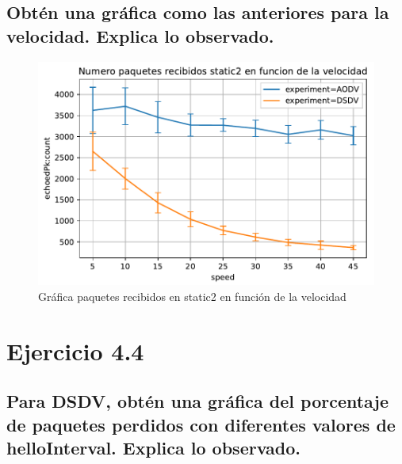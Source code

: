 \subsection{Obtén una gráfica como las anteriores para la velocidad. Explica lo observado.}

\begin{figure}[H]
    \centering
    \includegraphics{imaxes/graficas/ejer4_3.pdf}
    \caption{Gráfica paquetes recibidos en static2 en función de la velocidad}
    \label{fig:ejer4_1}
\end{figure}

\section{Ejercicio 4.4}

\subsection{Para DSDV, obtén una gráfica del porcentaje de paquetes perdidos con diferentes valores de helloInterval.
Explica lo observado.}